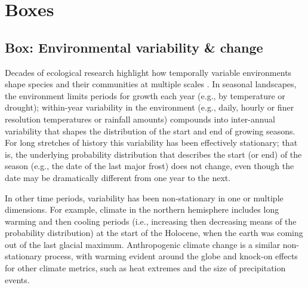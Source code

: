 \documentclass[11pt,letterpaper]{article}
\begin{document}


\newpage
\section{Boxes}

\subsection{Box: Environmental variability \& change} %
Decades of ecological research highlight how temporally variable environments shape species and their communities at multiple scales \citep{Sale:1977oq,Chesson:1997dz}.  In seasonal landscapes, the environment limits periods for growth each year (e.g., by temperature or drought); within-year variability in the environment (e.g., daily, hourly or finer resolution temperatures or rainfall amounts) compounds into inter-annual variability that shapes the distribution of the start and end of growing seasons. For long stretches of history this variability has been effectively stationary; that is, the underlying probability distribution that describes the start (or end) of the season (e.g., the date of the last major frost) does not change, even though the date may be dramatically different from one year to the  next. %

In other time periods, variability has been non-stationary in one or multiple dimensions. For example, climate in the northern hemisphere includes long warming and then cooling periods (i.e., increasing then decreasing means of the probability distribution) at the start of the Holocene, when the earth was coming out of the last glacial maximum. Anthropogenic climate change is a similar non-stationary process, with warming evident around the globe and knock-on effects for other climate metrics, such as heat extremes and the size of precipitation events. %
\end{document}
